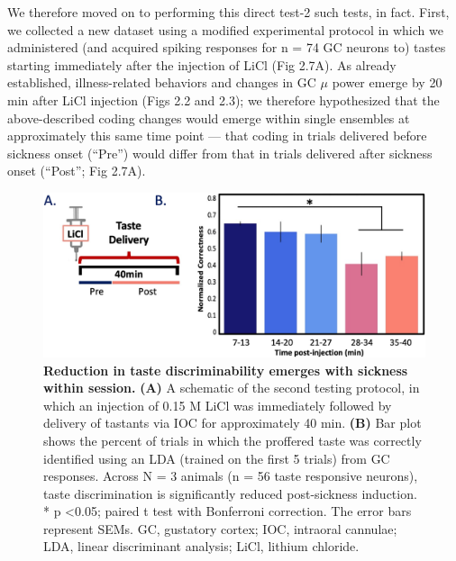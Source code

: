\begin{refsection}
We therefore moved on to performing this direct test-2 such tests, in fact. First, we collected a new dataset using a modified experimental protocol in which we administered (and acquired spiking responses for n = 74 GC neurons to) tastes starting immediately after the injection of LiCl (Fig 2.7A). As already established, illness-related behaviors and changes in GC \(\mu\) power emerge by 20 min after LiCl injection (Figs 2.2 and 2.3); we therefore hypothesized that the above-described coding changes would emerge within single ensembles at approximately this same time point --- that coding in trials delivered before sickness onset (“Pre”) would differ from that in trials delivered after sickness onset (“Post”; Fig 2.7A).

\begin{figure}
\includegraphics[width=\linewidth]{stone_2022_figs/journal.pbio.3001537.g007.png} 
\caption{\textbf{Reduction in taste discriminability emerges with sickness within session.} \textbf{(A)} A schematic of the second testing protocol, in which an injection of 0.15 M LiCl was immediately followed by delivery of tastants via IOC for approximately 40 min. \textbf{(B)} Bar plot shows the percent of trials in which the proffered taste was correctly identified using an LDA (trained on the first 5 trials) from GC responses. Across N = 3 animals (n = 56 taste responsive neurons), taste discrimination is significantly reduced post-sickness induction. * p \textless 0.05; paired t test with Bonferroni correction. The error bars represent SEMs. GC, gustatory cortex; IOC, intraoral cannulae; LDA, linear discriminant analysis; LiCl, lithium chloride.
}
\label{fig:wrapfig}
\end{figure}



\end{refsection}
